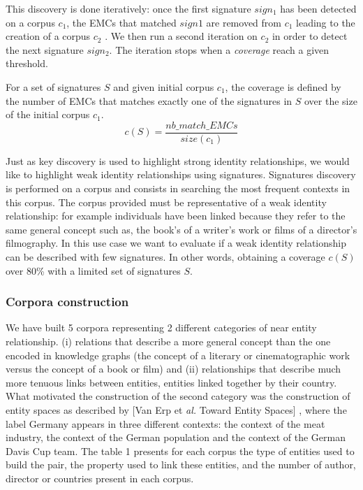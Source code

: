 \documentclass[runningheads]{llncs}
\begin{document}
This discovery is done iteratively: once the first signature $sign_{1}$ has been detected on a corpus $c_{1}$, the EMCs that matched $sign1$ are removed from $c_{1}$ leading to the creation of a corpus $c_{2}$ . 
We then run a second iteration on $c_{2}$ in order to detect the next signature $sign_{2}$.
The iteration stops when a \textit{coverage} reach a given threshold. 

For a set of signatures $S$ and given initial corpus $c_{1}$, the coverage is defined by the number of EMCs that matches exactly one of the signatures in $S$ over the size of the initial corpus $c_{1}$. 
\begin{equation*}
c(S) = \frac{nb\_match\_EMCs}{size(c_{1})}
\end{equation*}



Just as key discovery is used to highlight strong identity relationships,  we would like to highlight weak identity relationships using signatures. Signatures discovery is performed on a corpus and consists in searching the most frequent contexts in this corpus. The corpus provided must be representative of a weak identity relationship: for example individuals have been linked because they refer to the same general concept such as, the book's of a writer's work or films of a director's filmography. In this use case we want to evaluate if a weak identity relationship can be described with few signatures. In other words, obtaining a coverage $c(S)$ over 80\% with a limited set of signatures $S$.


\subsubsection{Corpora construction}
We have built 5 corpora representing 2 different categories of near entity relationship. (i) relations that describe a more general concept than the one encoded in knowledge graphs (the concept of a literary or cinematographic work versus the concept of a book or film) and 
(ii) relationships that describe much more tenuous links between entities, entities linked together by their country.  
What motivated the construction of the second category was the construction of entity spaces as described by [Van Erp et \textit{al.} Toward Entity Spaces] , where the label Germany appears in three different contexts: the context of the meat industry, the context of the German population and the context of the German Davis Cup team. 
The table 1 presents for each corpus the type of entities used to build the pair, the property used to link these entities, and the number of author, director or countries present in each corpus. 
 
\end{document}
